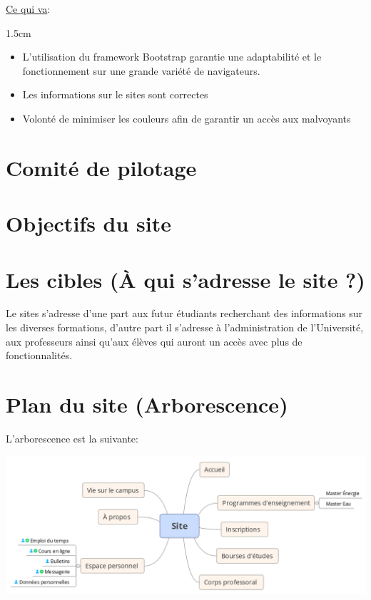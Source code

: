 \documentclass[oneside]{report}
\newcommand{\indentunder}{1.5cm}
\begin{document}
{	\par\underline{Ce qui va}:
		\vspace{.5cm}
		\begin{adjustwidth}{\indentunder}{}
		\begin{itemize}
			\item L'utilisation du framework Bootstrap garantie une adaptabilité et le fonctionnement sur une grande variété de navigateurs.
			\item Les informations sur le sites sont correctes
			\item Volonté de minimiser les couleurs afin de garantir un accès aux malvoyants
		\end{itemize}
		\end{adjustwidth}
	
		\section{Comité de pilotage}
		\section{Objectifs du site}
		\section{Les cibles (À qui s'adresse le site ?)}
		\par Le sites s'adresse d'une part aux futur étudiants recherchant des informations sur les diverses formations, d'autre part il s'adresse à l'administration de l'Université, aux professeurs ainsi qu'aux élèves qui auront un accès avec plus de fonctionnalités.
		\section{Plan du site (Arborescence)}
		\par L'arborescence est la suivante:\\
		\begin{center}
			\includegraphics[scale=1.5]{arborescence}
		\end{center}
}
\end{document}
